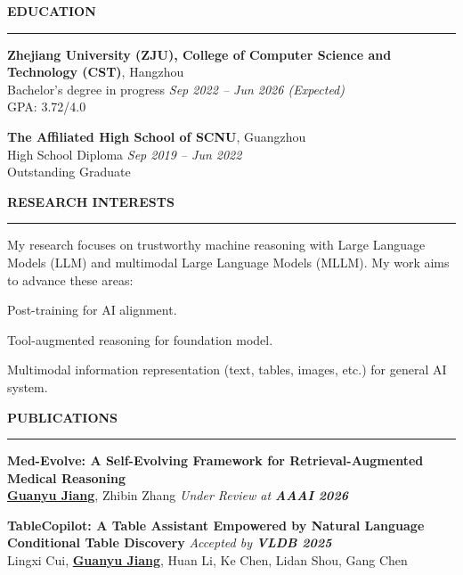 \documentclass{resume} %
\newcommand{\entitycolor}[1]{{\color{EntityColor}#1}}
\renewenvironment{rSection}[1]{
  \sectionskip
  \textcolor{ZJUBlue}{\bfseries\MakeUppercase{#1}} %
  \sectionlineskip
  \hrule
  \begin{list}{}{
    \setlength{\leftmargin}{1.5em}
  }
  \item[]
}{
  \end{list}
}
\begin{document}
\begin{rSection}{Education}
  {\bf \entitycolor{Zhejiang University (ZJU), College of Computer Science and Technology (CST)}}, Hangzhou
  \\ Bachelor's degree in progress \hfill {\em Sep 2022 -- Jun 2026 (Expected)}
  \\ GPA: 3.72/4.0

  {\bf \entitycolor{The Affiliated High School of SCNU}}, Guangzhou
  \\ High School Diploma \hfill {\em Sep 2019 -- Jun 2022}
  \\ Outstanding Graduate
\end{rSection}



\begin{rSection}{Research Interests}
  \begin{rSubsection}{My research focuses on trustworthy machine reasoning with Large Language Models (LLM) and multimodal Large Language Models (MLLM). My work aims to advance these areas:}{}{}{}
    \item Post-training for AI alignment.
    \item Tool-augmented reasoning for foundation model.
    \item Multimodal information representation (text, tables, images, etc.) for general AI system.
  \end{rSubsection}
\end{rSection}



\begin{rSection}{Publications}
  
  \textbf{\entitycolor{Med-Evolve: A Self-Evolving Framework for Retrieval-Augmented Medical Reasoning}} \\
  \underline{\textbf{Guanyu Jiang}}, Zhibin Zhang \hfill {\em Under Review at {\bf AAAI 2026}}
  
  \textbf{\entitycolor{TableCopilot: A Table Assistant Empowered by Natural Language Conditional Table Discovery}} \hfill {\em Accepted by {\bf VLDB 2025}} \\
  Lingxi Cui, \underline{\textbf{Guanyu Jiang}}, Huan Li, Ke Chen, Lidan Shou, Gang Chen
  
\end{rSection}
\end{document}
